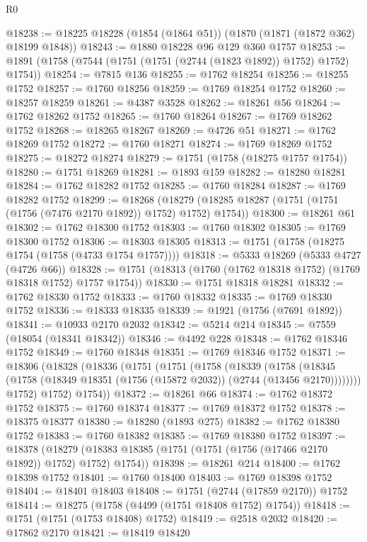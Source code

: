 \begin{lexlean}{R0}
\begin{coremodule}
@18238 := @18225 @18228 (@1854 (@1864 @51)) (@1870 (@1871 (@1872 @362) @18199 @1848))
@18243 := @1880 @18228 @96 @129 @360 @1757
@18253 := @1891 (@1758 (@7544 (@1751 (@1751 (@2744 (@1823 @1892)) @1752) @1752) @1754))
@18254 := @7815 @136
@18255 := @1762 @18254
@18256 := @18255 @1752
@18257 := @1760 @18256
@18259 := @1769 @18254 @1752
@18260 := @18257 @18259
@18261 := @4387 @3528
@18262 := @18261 @56
@18264 := @1762 @18262 @1752
@18265 := @1760 @18264
@18267 := @1769 @18262 @1752
@18268 := @18265 @18267
@18269 := @4726 @51
@18271 := @1762 @18269 @1752
@18272 := @1760 @18271
@18274 := @1769 @18269 @1752
@18275 := @18272 @18274
@18279 := @1751 (@1758 (@18275 @1757 @1754))
@18280 := @1751 @18269
@18281 := @1893 @159
@18282 := @18280 @18281
@18284 := @1762 @18282 @1752
@18285 := @1760 @18284
@18287 := @1769 @18282 @1752
@18299 := @18268
    (@18279 (@18285 @18287 (@1751 (@1751 (@1756 (@7476 @2170 @1892)) @1752) @1752) @1754))
@18300 := @18261 @61
@18302 := @1762 @18300 @1752
@18303 := @1760 @18302
@18305 := @1769 @18300 @1752
@18306 := @18303 @18305
@18313 := @1751 (@1758 (@18275 @1754 (@1758 (@4733 @1754 @1757))))
@18318 := @5333 @18269 (@5333 @4727 (@4726 @66))
@18328 := @1751 (@18313 (@1760 (@1762 @18318 @1752) (@1769 @18318 @1752) @1757 @1754))
@18330 := @1751 @18318 @18281
@18332 := @1762 @18330 @1752
@18333 := @1760 @18332
@18335 := @1769 @18330 @1752
@18336 := @18333 @18335
@18339 := @1921 (@1756 (@7691 @1892))
@18341 := @10933 @2170 @2032
@18342 := @5214 @214
@18345 := @7559 (@18054 (@18341 @18342))
@18346 := @4492 @228
@18348 := @1762 @18346 @1752
@18349 := @1760 @18348
@18351 := @1769 @18346 @1752
@18371 := @18306
    (@18328
      (@18336
        (@1751
          (@1751
            (@1758
              (@18339
                (@1758
                  (@18345 (@1758 (@18349 @18351 (@1756 (@15872 @2032)) (@2744 (@13456 @2170))))))))
            @1752)
          @1752)
        @1754))
@18372 := @18261 @66
@18374 := @1762 @18372 @1752
@18375 := @1760 @18374
@18377 := @1769 @18372 @1752
@18378 := @18375 @18377
@18380 := @18280 (@1893 @275)
@18382 := @1762 @18380 @1752
@18383 := @1760 @18382
@18385 := @1769 @18380 @1752
@18397 := @18378
    (@18279 (@18383 @18385 (@1751 (@1751 (@1756 (@17466 @2170 @1892)) @1752) @1752) @1754))
@18398 := @18261 @214
@18400 := @1762 @18398 @1752
@18401 := @1760 @18400
@18403 := @1769 @18398 @1752
@18404 := @18401 @18403
@18408 := @1751 (@2744 (@17859 @2170)) @1752
@18414 := @18275 (@1758 (@4499 (@1751 @18408 @1752) @1754))
@18418 := @1751 (@1751 (@1753 @18408) @1752)
@18419 := @2518 @2032
@18420 := @17862 @2170
@18421 := @18419 @18420

\end{coremodule}
\end{lexlean}
